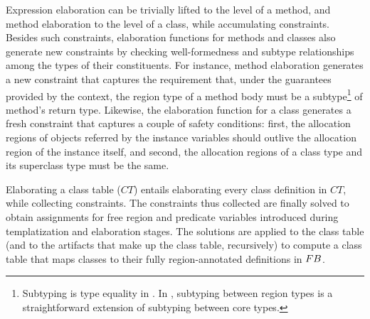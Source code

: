 
Expression elaboration can be trivially lifted to the level of a
method, and method elaboration to the level of a class, while
accumulating constraints. Besides such constraints, elaboration
functions for methods and classes also generate new constraints by
checking well-formedness and subtype relationships among the types of
their constituents. For instance, method elaboration generates a new
constraint that captures the requirement that, under the guarantees
provided by the context, the region type of a method body must be a
subtype\footnote{Subtyping is type equality in \FB. In \name,
subtyping between region types is a straightforward extension of
subtyping between core types.} of method's return type.  Likewise, the
elaboration function for a class generates a fresh constraint that
captures a couple of safety conditions: first, the allocation regions
of objects referred by the instance variables should outlive the
allocation region of the instance itself, and second, the allocation
regions of a class type and its superclass type must be the same.

Elaborating a class table ($CT$) entails elaborating every class
definition in $CT$, while collecting constraints. The constraints thus
collected are finally solved to obtain assignments for free region and
predicate variables introduced during templatization and elaboration
stages. The solutions are applied to the class table (and to the
artifacts that make up the class table, recursively) to compute a
class table that maps classes to their fully region-annotated
definitions in ${\sc FB}$.

